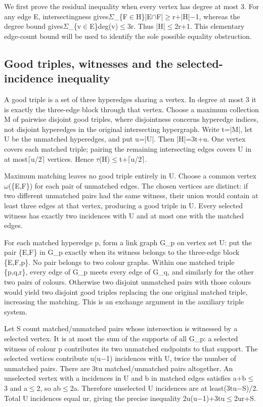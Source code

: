 \documentclass[11pt,a4paper]{article}
\begin{document}
We first prove the residual inequality when every vertex has degree at most 3. For any edge E, intersectingness gives\ensuremath{\Sigma}\_\{F\ensuremath{\in}H\}|E\ensuremath{\cap}F|\ensuremath{\geq}r+|H|\ensuremath{-}1, whereas the degree bound gives\ensuremath{\Sigma}\_\{v\ensuremath{\in}E\}deg(v)\ensuremath{\leq}3r. Thus |H|\ensuremath{\leq}2r+1. This elementary edge-count bound will be used to identify the sole possible equality obstruction.

\subsection{Good triples, witnesses and the selected-incidence inequality}
A good triple is a set of three hyperedges sharing a vertex. In degree at most 3 it is exactly the three-edge block through that vertex. Choose a maximum collection M of pairwise disjoint good triples, where disjointness concerns hyperedge indices, not disjoint hyperedges in the original intersecting hypergraph. Write t=|M|, let U be the unmatched hyperedges, and put u=|U|. Then |H|=3t+u. One vertex covers each matched triple; pairing the remaining intersecting edges covers U in at most\ensuremath{\lceil}u/2\ensuremath{\rceil} vertices. Hence \ensuremath{\tau}(H)\ensuremath{\leq}t+\ensuremath{\lceil}u/2\ensuremath{\rceil}.

Maximum matching leaves no good triple entirely in U. Choose a common vertex \ensuremath{\omega}(\{E,F\}) for each pair of unmatched edges. The chosen vertices are distinct: if two different unmatched pairs had the same witness, their union would contain at least three edges at that vertex, producing a good triple in U. Every selected witness has exactly two incidences with U and at most one with the matched edges.

For each matched hyperedge p, form a link graph G\_p on vertex set U: put the pair \{E,F\} in G\_p exactly when its witness belongs to the three-edge block \{E,F,p\}. No pair belongs to two colour graphs. Within one matched triple \{p,q,r\}, every edge of G\_p meets every edge of G\_q, and similarly for the other two pairs of colours. Otherwise two disjoint unmatched pairs with those colours would yield two disjoint good triples replacing the one original matched triple, increasing the matching. This is an exchange argument in the auxiliary triple system.

Let S count matched/unmatched pairs whose intersection is witnessed by a selected vertex. It is at most the sum of the supports of all G\_p: a selected witness of colour p contributes its two unmatched endpoints to that support. The selected vertices contribute u(u\ensuremath{-}1) incidences with U, twice the number of unmatched pairs. There are 3tu matched/unmatched pairs altogether. An unselected vertex with a incidences in U and b in matched edges satisfies a+b\ensuremath{\leq}3 and a\ensuremath{\leq}2, so ab\ensuremath{\leq}2a. Therefore unselected U incidences are at least(3tu\ensuremath{-}S)/2. Total U incidences equal ur, giving the precise inequality 2u(u\ensuremath{-}1)+3tu\ensuremath{\leq}2ur+S.
\end{document}
